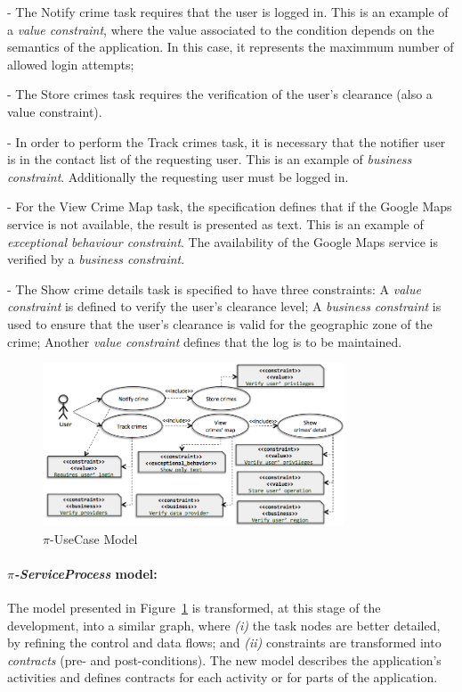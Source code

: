 \begin{trivlist}
  \item[-] The \textsf{Notify crime} task requires that the user is logged in. 
  This is an example of a \textit{value constraint}, where the value associated to the condition depends on the semantics of the application.
  In this case, it represents the maximmum number of allowed login attempts;
\item[-] The \textsf{Store crimes} task requires the verification of the user's clearance (also a value constraint). 
\item[-] In order to perform the \textsf{Track crimes} task, it is necessary that the notifier user is in the contact list of the requesting user.
This is an example of \textit{business constraint}.
Additionally the requesting user must be logged in.
\item[-]  For the \textsf{View Crime Map} task, the specification defines that if the Google Maps service is not available, the result is presented as text. This is an example of \textit{exceptional behaviour constraint}. 
The availability of the Google Maps service is verified by a \textit{business constraint}.
 \item[-] The \textsf{Show crime details} task is specified to have three constraints: A \textit{value constraint} is defined to verify the user's clearance level; A \textit{business constraint} is used to ensure that the user's clearance is valid for the geographic zone of the crime; Another \textit{value constraint} defines that the log is to be maintained.
\end{trivlist}
\begin{figure}[ht!]
\centering
\includegraphics[width=0.8\textwidth]{figs/piUseCase}
\caption{$\pi$-UseCase Model}
\label{fig:piUC}
\end{figure}
\paragraph*{\textit{$\pi$-ServiceProcess} model:}
The model presented in Figure~\ref{fig:piUC} is transformed, at this stage of the development, into a similar graph, where \textit{(i)} the task nodes are better detailed, by refining the control and data flows; and \textit{(ii)} constraints are transformed into \textit{contracts} (pre- and post-conditions).
The new model describes the application's activities and defines contracts for each activity or for parts of the application.

